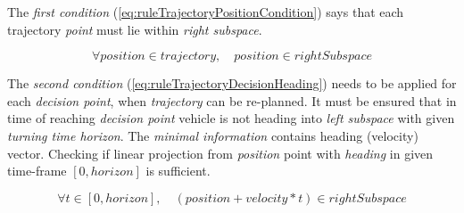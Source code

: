     The \emph{first condition} (\ref{eq:ruleTrajectoryPositionCondition}) says that each trajectory \emph{point} must lie within \emph{right subspace}. 
    
    \begin{equation}\label{eq:ruleTrajectoryPositionCondition}
        \forall position \in trajectory,\quad position \in rightSubspace
    \end{equation}
    
    \noindent The \emph{second condition} (\ref{eq:ruleTrajectoryDecisionHeading}) needs to be applied for each \emph{decision point}, when \emph{trajectory} can be re-planned. It must be ensured that in time of reaching \emph{decision point} vehicle is not heading into \emph{left subspace} with given \emph{turning time horizon}. The \emph{minimal information} contains heading (velocity) vector. Checking if linear projection from \emph{position} point with \emph{heading} in given time-frame $[0,horizon]$ is sufficient.
    
    \begin{equation}\label{eq:ruleTrajectoryDecisionHeading}
        \forall t\in[0,horizon],\quad \left(position + velocity*t\right) \in rightSubspace
    \end{equation}
    
